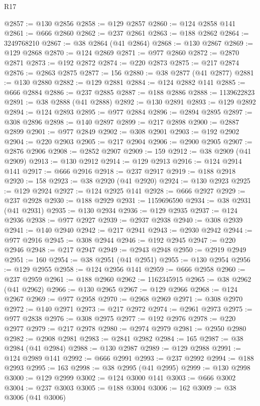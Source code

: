 \begin{lexlean}{R17}
\begin{coremodule}
@2857 := @130 @2856
@2858 := @129 @2857
@2860 := @124 @2858 @141
@2861 := @666 @2860
@2862 := @237 @2861
@2863 := @188 @2862
@2864 := 3249768210
@2867 := @38 @2864 (@41 @2864)
@2868 := @130 @2867
@2869 := @129 @2868
@2870 := @124 @2869
@2871 := @977 @2860
@2872 := @2870 @2871
@2873 := @192 @2872
@2874 := @220 @2873
@2875 := @217 @2874
@2876 := @2863 @2875
@2877 := 156
@2880 := @38 @2877 (@41 @2877)
@2881 := @130 @2880
@2882 := @129 @2881
@2884 := @124 @2882 @141
@2885 := @666 @2884
@2886 := @237 @2885
@2887 := @188 @2886
@2888 := 1139622823
@2891 := @38 @2888 (@41 @2888)
@2892 := @130 @2891
@2893 := @129 @2892
@2894 := @124 @2893
@2895 := @977 @2884
@2896 := @2894 @2895
@2897 := @308 @2896
@2898 := @140 @2897
@2899 := @217 @2898
@2900 := @2887 @2899
@2901 := @977 @2849
@2902 := @308 @2901
@2903 := @192 @2902
@2904 := @220 @2903
@2905 := @217 @2904
@2906 := @2900 @2905
@2907 := @2876 @2906
@2908 := @2852 @2907
@2909 := 159
@2912 := @38 @2909 (@41 @2909)
@2913 := @130 @2912
@2914 := @129 @2913
@2916 := @124 @2914 @141
@2917 := @666 @2916
@2918 := @237 @2917
@2919 := @188 @2918
@2920 := 158
@2923 := @38 @2920 (@41 @2920)
@2924 := @130 @2923
@2925 := @129 @2924
@2927 := @124 @2925 @141
@2928 := @666 @2927
@2929 := @237 @2928
@2930 := @188 @2929
@2931 := 1159696590
@2934 := @38 @2931 (@41 @2931)
@2935 := @130 @2934
@2936 := @129 @2935
@2937 := @124 @2936
@2938 := @977 @2927
@2939 := @2937 @2938
@2940 := @308 @2939
@2941 := @140 @2940
@2942 := @217 @2941
@2943 := @2930 @2942
@2944 := @977 @2916
@2945 := @308 @2944
@2946 := @192 @2945
@2947 := @220 @2946
@2948 := @217 @2947
@2949 := @2943 @2948
@2950 := @2919 @2949
@2951 := 160
@2954 := @38 @2951 (@41 @2951)
@2955 := @130 @2954
@2956 := @129 @2955
@2958 := @124 @2956 @141
@2959 := @666 @2958
@2960 := @237 @2959
@2961 := @188 @2960
@2962 := 1162345915
@2965 := @38 @2962 (@41 @2962)
@2966 := @130 @2965
@2967 := @129 @2966
@2968 := @124 @2967
@2969 := @977 @2958
@2970 := @2968 @2969
@2971 := @308 @2970
@2972 := @140 @2971
@2973 := @217 @2972
@2974 := @2961 @2973
@2975 := @977 @2838
@2976 := @308 @2975
@2977 := @192 @2976
@2978 := @220 @2977
@2979 := @217 @2978
@2980 := @2974 @2979
@2981 := @2950 @2980
@2982 := @2908 @2981
@2983 := @2841 @2982
@2984 := 165
@2987 := @38 @2984 (@41 @2984)
@2988 := @130 @2987
@2989 := @129 @2988
@2991 := @124 @2989 @141
@2992 := @666 @2991
@2993 := @237 @2992
@2994 := @188 @2993
@2995 := 163
@2998 := @38 @2995 (@41 @2995)
@2999 := @130 @2998
@3000 := @129 @2999
@3002 := @124 @3000 @141
@3003 := @666 @3002
@3004 := @237 @3003
@3005 := @188 @3004
@3006 := 162
@3009 := @38 @3006 (@41 @3006)

\end{coremodule}
\end{lexlean}
